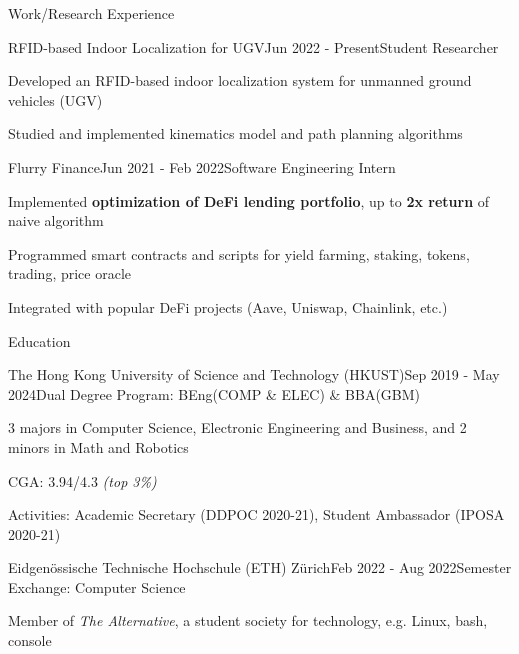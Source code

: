 \documentclass{resume}
\begin{document}
\begin{rSection}{Work/Research Experience}
    
    \begin{rSubsection}{RFID-based Indoor Localization for UGV}{Jun 2022 - Present}{Student Researcher}{}
        \item Developed an RFID-based indoor localization system for unmanned ground vehicles (UGV)
        \item Studied and implemented kinematics model and path planning algorithms
    \end{rSubsection}
    
    \begin{rSubsection}{Flurry Finance}{Jun 2021 - Feb 2022}{Software Engineering Intern}{}
        \item Implemented \textbf{optimization of DeFi lending portfolio}, up to \textbf{2x return} of naive algorithm
        \item Programmed smart contracts and scripts for yield farming, staking, tokens, trading, price oracle
        \item Integrated with popular DeFi projects (Aave, Uniswap, Chainlink, etc.)
    \end{rSubsection}
    
\end{rSection}

\begin{rSection}{Education}

    \begin{rSubsection}{The Hong Kong University of Science and Technology (HKUST)}{Sep 2019 - May 2024}{Dual Degree Program: BEng(COMP \& ELEC) \& BBA(GBM)}{}
        \item 3 majors in Computer Science, Electronic Engineering and Business, and 2 minors in Math and Robotics
        \item CGA: 3.94/4.3 \emph{(top 3\%)}
        \item Activities: Academic Secretary (DDPOC 2020-21), Student Ambassador (IPOSA 2020-21)
    \end{rSubsection}

    \begin{rSubsection}{Eidgenössische Technische Hochschule (ETH) Zürich}{Feb 2022 - Aug 2022}{Semester Exchange: Computer Science}{}
        \item Member of \emph{The Alternative}, a student society for technology, e.g. Linux, bash, console
    \end{rSubsection}

\end{rSection}
\end{document}
